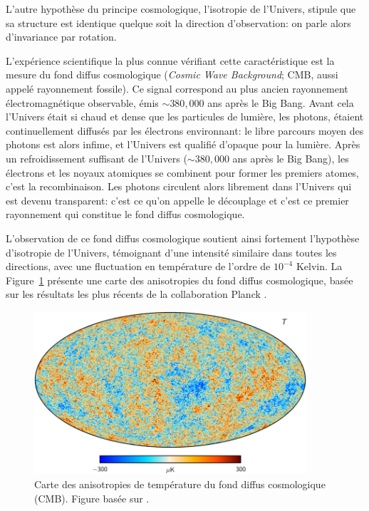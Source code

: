 \documentclass[../main/main.tex]{subfiles}
\begin{document}
L'autre hypothèse du principe cosmologique, l'isotropie de l'Univers,
stipule que sa structure est identique quelque soit la direction
d'observation: on parle alors d'invariance par rotation.

L'expérience scientifique la plus connue vérifiant cette caractéristique
est la mesure du fond diffus cosmologique (\textit{Cosmic Wave
  Background}; CMB, aussi appelé rayonnement fossile). Ce signal correspond au plus ancien rayonnement
électromagnétique observable, émis $\sim380,000$ ans après le Big
Bang. Avant cela l'Univers était si chaud et dense que les particules
de lumière, les photons, étaient continuellement
diffusés par les électrons environnant: le libre parcours moyen des
photons est alors infime, et l'Univers est qualifié \og d'opaque\fg{} pour la
lumière.
Après un refroidissement suffisant de l'Univers ($\sim380,000$ ans après le Big
Bang), les électrons et
les noyaux atomiques se combinent pour former les premiers atomes, c'est
la recombinaison. Les photons circulent alors librement dans l'Univers
qui est devenu \og transparent\fg{}: c'est ce qu'on appelle le découplage et
c'est ce premier rayonnement qui constitue le fond diffus cosmologique.

L'observation de ce fond diffus cosmologique soutient ainsi fortement l'hypothèse
d'isotropie de l'Univers, témoignant d'une intensité similaire dans
toutes les directions, avec une fluctuation en température de l'ordre de $10^{-4}$
Kelvin.
La Figure~\ref{fig:cmb} présente une carte des anisotropies du fond
diffus cosmologique, basée sur les résultats les plus récents de la
collaboration Planck \citep{Planckisotropy18}.
\begin{figure}[ht]
  \centering
  \includegraphics[width=0.9\textwidth]{../figures/01_cosmology/CMB_Planck18.png}
  \caption[Carte des anisotropies de température du fond diffus
  cosmologique (CMB).]{Carte des anisotropies de température du fond
    diffus cosmologique (CMB). Figure basée sur
    \citet{Planckisotropy18}.}
\label{fig:cmb}
\end{figure}
\end{document}

